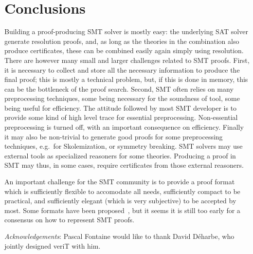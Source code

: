 \documentclass{llncs}
\begin{document}


\section{Conclusions}


Building a proof-producing SMT solver is mostly easy: the underlying SAT solver
generate resolution proofs, and, as long as the theories in the combination also
produce certificates, these can be combined easily again simply using
resolution.  There are however many small and larger challenges related to SMT
proofs.  First, it is necessary to collect and store all the necessary
information to produce the final proof; this is mostly a technical problem, but,
if this is done in memory, this can be the bottleneck of the proof search.
Second, SMT often relies on many preprocessing techniques, some being necessary
for the soundness of tool, some being useful for efficiency.  The attitude
followed by most SMT developer is to provide some kind of high level trace for
essential preprocessing.  Non-essential preprocessing is turned off, with an
important consequence on efficiency.  Finally it may also be non-trivial to
generate good proofs for some preprocessing techniques, e.g.\ for Skolemization,
or symmetry breaking.  SMT solvers may use external tools as specialized
reasoners for some theories.  Producing a proof in SMT may thus, in some cases,
require certificates from those external reasoners.

An important challenge for the SMT community is to provide a proof format which
is sufficiently flexible to accomodate all needs, sufficiently compact to be
practical, and sufficiently elegant (which is very subjective) to be accepted by
most.  Some formats have been proposed~\cite{}, but it seems it is still too early for a consensus on how to represent
SMT proofs.


\medskip
\emph{Acknowledgements}: Pascal Fontaine would like to thank David D\'{e}harbe,
who jointly designed veriT with him.




\end{document}
